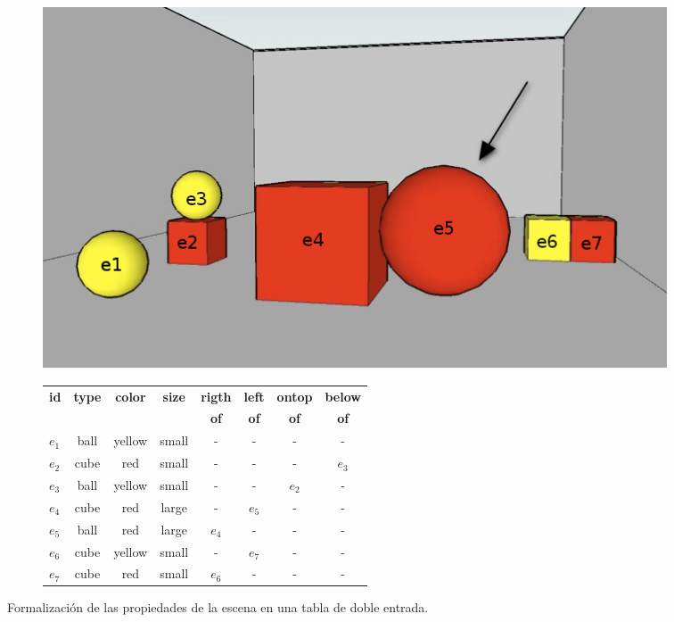 \begin{figure}[h]
\begin{subfigure}{.45\textwidth}
  \centering
	\vspace*{-.2cm}
\includegraphics[width=\textwidth]{images/22.jpg}
  \caption{}\label{GRE3D7-stimulus1-ids}
\end{subfigure}
\begin{subfigure}{1\textwidth}
\hspace*{-16cm}
\begin{scriptsize}
\begin{tabular}{|l|c|c|c|c|c|c|c|}
\hline
\textbf {id}& 	\textbf {type}		&	\textbf {color}	&	\textbf {size}& \textbf {rigth} & \textbf {left} & \textbf {ontop}	& \textbf {below}	\\
   	   &  	    			&	    		&	     		&  \textbf {of}   		 &  \textbf {of}	    &  \textbf {of}	&  \textbf {of}\\
\hline \hline
$e_1$ & ball & yellow & small & - & - & - & - \\
$e_2$ & cube & red & small & - & - &- & $e_3$ \\
$e_3$ & ball & yellow & small & - & - & $e_2$ & -\\
$e_4$ & cube & red & large & - & $e_5$ & - & -\\
$e_5$ & ball & red & large & $e_4$ & - & - & -\\
$e_6$ & cube & yellow & small & - & $e_7$ & - & -\\
$e_7$ & cube & red & small & $e_6$ & - & - & -\\
\hline

\end{tabular}
\end{scriptsize}
\vspace*{1cm}
\centering \hspace*{-8cm} \caption{}\label{tabla-propiedades}
\end{subfigure}
\caption{Formalizaci\'on de las propiedades de la escena en una tabla de doble entrada.}\label{contexto-tabla-propiedades}
\end{figure}

